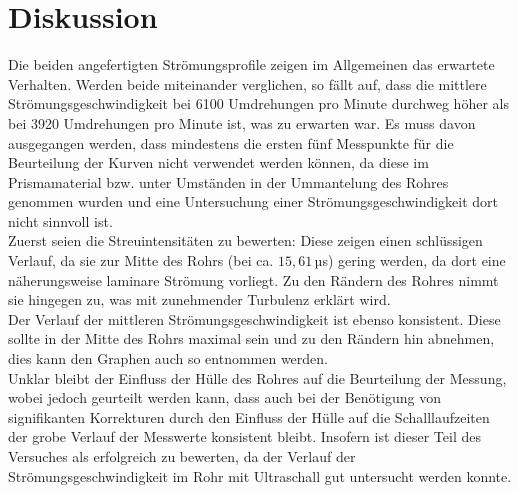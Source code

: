 \section{Diskussion}
\label{sec:Diskussion}

Die beiden angefertigten Strömungsprofile zeigen im Allgemeinen das erwartete Verhalten.
Werden beide miteinander verglichen, so fällt auf, dass die mittlere Strömungsgeschwindigkeit
bei 6100 Umdrehungen pro Minute durchweg höher als bei 3920 Umdrehungen pro Minute ist, was
zu erwarten war. Es muss davon ausgegangen werden, dass mindestens die ersten fünf Messpunkte
für die Beurteilung der Kurven nicht verwendet werden können, da diese im Prismamaterial
bzw. unter Umständen in der Ummantelung des Rohres genommen wurden und eine Untersuchung
einer Strömungsgeschwindigkeit dort nicht sinnvoll ist.\\
Zuerst seien die Streuintensitäten zu bewerten: Diese zeigen einen schlüssigen Verlauf,
da sie zur Mitte des Rohrs (bei ca. $15{,}61$\,µs) gering werden, da dort eine näherungsweise
laminare Strömung vorliegt. Zu den Rändern des Rohres nimmt sie hingegen zu, was mit zunehmender
Turbulenz erklärt wird.\\
Der Verlauf der mittleren Strömungsgeschwindigkeit ist ebenso konsistent. Diese
sollte in der Mitte des Rohrs maximal sein und zu den Rändern hin abnehmen, dies kann den Graphen
auch so entnommen werden.\\
Unklar bleibt der Einfluss der Hülle des Rohres auf die Beurteilung der Messung, wobei
jedoch geurteilt werden kann, dass auch bei der Benötigung von signifikanten Korrekturen
durch den Einfluss der Hülle auf die Schalllaufzeiten der grobe Verlauf der Messwerte
konsistent bleibt. Insofern ist dieser Teil des Versuches als erfolgreich zu bewerten, da
der Verlauf der Strömungsgeschwindigkeit im Rohr mit Ultraschall gut untersucht werden konnte.
